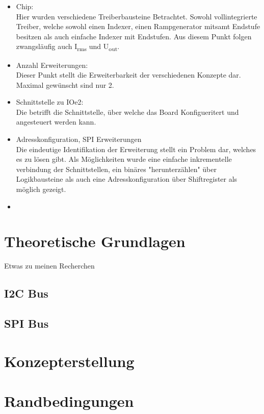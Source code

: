 \documentclass[]{article}
\begin{document}
\begin{itemize}
    \item Chip:
        \\ Hier wurden verschiedene Treiberbausteine Betrachtet. Sowohl vollintegrierte Treiber, welche
        sowohl einen Indexer, einen Rampgenerator mitsamt Endstufe besitzen als auch einfache Indexer mit
        Endstufen. Aus diesem Punkt folgen zwangsläufig auch I\textsubscript{rms} und U\textsubscript{out}. 
    \item Anzahl Erweiterungen: 
        \\ Dieser Punkt stellt die Erweiterbarkeit der verschiedenen Konzepte dar. Maximal gewünscht sind
        nur 2.
    \item Schnittstelle zu IOe2:
        \\ Die betrifft die Schnittstelle, über welche das Board Konfigueritert und angesteuert werden kann.
    \item Adresskonfiguration, SPI Erweiterungen
        \\ Die eindeutige Identifikation der Erweiterung stellt ein Problem dar, welches es zu lösen gibt. 
        Als Möglichkeiten wurde eine einfache inkrementelle verbindung der Schnittstellen, ein binäres "herunterzählen" 
        über Logikbausteine als auch eine Adresskonfiguration über Shiftregister als möglich gezeigt. 
    \item 
\end{itemize}




\section{Theoretische Grundlagen}

Etwas zu meinen Recherchen
\subsection{I2C Bus}
\subsection{SPI Bus}

\section{Konzepterstellung}
\section{Randbedingungen}
\end{document}
